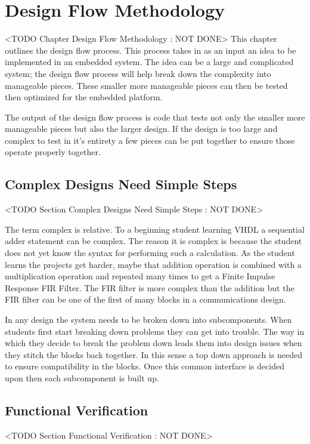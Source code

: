 \chapter{Design Flow Methodology}
	<TODO Chapter Design Flow Methodology : NOT DONE>
This chapter outlines the design flow process. This process takes in as an input an idea to be implemented in an embedded system. The idea can be a large and complicated system; the design flow process will help break down the complexity into manageable pieces. These smaller more manageable pieces can then be tested then optimized for the embedded platform. 

The output of the design flow process is code that tests not only the smaller more manageable pieces but also the larger design. If the design is too large and complex to test in it's entirety a few pieces can be put together to ensure those operate properly together. 

\section{Complex Designs Need Simple Steps}
	<TODO Section Complex Designs Need Simple Steps : NOT DONE>

The term complex is relative. To a beginning student learning VHDL a sequential adder statement can be complex. The reason it is complex is because the student does not yet know the syntax for performing such a calculation. As the student learns the projects get harder, maybe that addition operation is combined with a multiplication operation and repeated many times to get a Finite Impulse Response \ac{FIR} Filter.  The FIR filter is more complex than the addition but the FIR filter can be one of the first of many blocks in a communications design. 

In any design the system needs to be broken down into subcomponents. When students first start breaking down problems they can get into trouble. The way in which they decide to break the problem down leads them into design issues when they stitch the blocks back together. In this sense a top down approach is needed to ensure compatibility in the blocks. Once this common interface is decided upon then each subcomponent is built up.
	
\section{Functional Verification}
	<TODO Section Functional Verification : NOT DONE>

